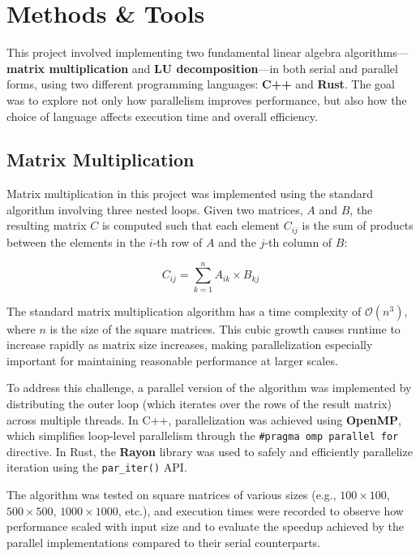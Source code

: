 \documentclass[12pt]{article}
\begin{document}
\section{Methods \& Tools}

This project involved implementing two fundamental linear algebra algorithms---\textbf{matrix multiplication} and \textbf{LU decomposition}---in both
serial and parallel forms, using two different programming languages: \textbf{C++} and \textbf{Rust}. The goal was to explore not only how parallelism
improves performance, but also how the choice of language affects execution time and overall efficiency.

\subsection*{Matrix Multiplication}

Matrix multiplication in this project was implemented using the standard algorithm involving three nested loops. Given two matrices, \( A \) and \( B \),
the resulting matrix \( C \) is computed such that each element \( C_{ij} \) is the sum of products between the elements in the \( i \)-th row of \( A \)
and the \( j \)-th column of \( B \):

\[
    C_{ij} = \sum_{k=1}^{n} A_{ik} \times B_{kj}
\]

The standard matrix multiplication algorithm has a time complexity of \( \mathcal{O}(n^3) \), where \( n \) is the size of the square matrices.
This cubic growth causes runtime to increase rapidly as matrix size increases, making parallelization especially important for maintaining reasonable
performance at larger scales.

To address this challenge, a parallel version of the algorithm was implemented by distributing the outer loop (which iterates over the rows of the
result matrix) across multiple threads. In C++, parallelization was achieved using \textbf{OpenMP}, which simplifies loop-level parallelism through
the \texttt{\#pragma omp parallel for} directive. In Rust, the \textbf{Rayon} library was used to safely and efficiently parallelize iteration using
the \texttt{par\_iter()} API.

The algorithm was tested on square matrices of various sizes (e.g., \(100 \times 100\), \(500 \times 500\), \(1000 \times 1000\), etc.), and execution
times were recorded to observe how performance scaled with input size and to evaluate the speedup achieved by the parallel implementations compared to
their serial counterparts.
\end{document}
